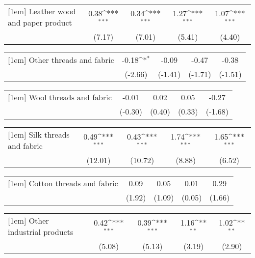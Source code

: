 {
\def\sym#1{\ifmmode^{#1}\else\(^{#1}\)\fi}
\begin{tabular}{l*{4}{c}}
[1em]
Leather wood and paper product&     0.38\sym{***}&     0.34\sym{***}&     1.27\sym{***}&     1.07\sym{***}\\
                &   (7.17)         &   (7.01)         &   (5.41)         &   (4.40)         \\
\end{tabular}
}
{
\def\sym#1{\ifmmode^{#1}\else\(^{#1}\)\fi}
\begin{tabular}{l*{4}{c}}
[1em]
Other threads and fabric&    -0.18\sym{*}  &    -0.09         &    -0.47         &    -0.38         \\
                &  (-2.66)         &  (-1.41)         &  (-1.71)         &  (-1.51)         \\
\end{tabular}
}
{
\def\sym#1{\ifmmode^{#1}\else\(^{#1}\)\fi}
\begin{tabular}{l*{4}{c}}
[1em]
Wool threads and fabric&    -0.01         &     0.02         &     0.05         &    -0.27         \\
                &  (-0.30)         &   (0.40)         &   (0.33)         &  (-1.68)         \\
\end{tabular}
}
{
\def\sym#1{\ifmmode^{#1}\else\(^{#1}\)\fi}
\begin{tabular}{l*{4}{c}}
[1em]
Silk threads and fabric&     0.49\sym{***}&     0.43\sym{***}&     1.74\sym{***}&     1.65\sym{***}\\
                &  (12.01)         &  (10.72)         &   (8.88)         &   (6.52)         \\
\end{tabular}
}
{
\def\sym#1{\ifmmode^{#1}\else\(^{#1}\)\fi}
\begin{tabular}{l*{4}{c}}
[1em]
Cotton threads and fabric&     0.09         &     0.05         &     0.01         &     0.29         \\
                &   (1.92)         &   (1.09)         &   (0.05)         &   (1.66)         \\
\end{tabular}
}
{
\def\sym#1{\ifmmode^{#1}\else\(^{#1}\)\fi}
\begin{tabular}{l*{4}{c}}
[1em]
Other industrial products&     0.42\sym{***}&     0.39\sym{***}&     1.16\sym{**} &     1.02\sym{**} \\
                &   (5.08)         &   (5.13)         &   (3.19)         &   (2.90)         \\
\end{tabular}
}
